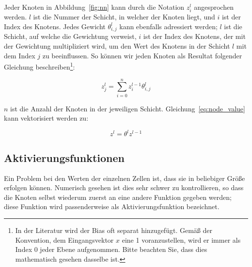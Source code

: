 Jeder Knoten in Abbildung~\ref{fig:nn} kann durch die Notation $z^l_i$ angesprochen werden.
$l$ ist die Nummer der Schicht, in welcher der Knoten liegt, und $i$ ist der Index des Knotens.
Jedes Gewicht $\theta^l_{i, j}$ kann ebenfalls adressiert werden; $l$ ist die Schicht, auf welche die Gewichtung verweist, $i$ ist der Index des Knotens, der mit der Gewichtung multipliziert wird, um den Wert des Knotens in der Schicht $l$ mit dem Index $j$ zu beeinflussen.
So können wir jeden Knoten als Resultat folgender Gleichung beschreiben\footnote{In der Literatur wird der Bias oft separat hinzugefügt.
Gemäß der Konvention, dem Eingangsvektor $x$ eine 1 voranzustellen, wird er immer als Index 0 jeder Ebene aufgenommen.
Bitte beachten Sie, dass dies mathematisch gesehen dasselbe ist.}:

\begin{equation}
    z^l_j = \sum^n_{i=0}z^{l-1}_i\theta^l_{i, j}
    \label{eq:node_value}
\end{equation}

$n$ ist die Anzahl der Knoten in der jeweiligen Schicht. Gleichung~\eqref{eq:node_value} kann vektorisiert werden zu:

\begin{equation}
    z^l = \theta^l z^{l-1}
    \label{eq:node_value_vectorized}
\end{equation}

\subsection{Aktivierungsfunktionen}

Ein Problem bei den Werten der einzelnen Zellen ist, dass sie in beliebiger Größe erfolgen können. Numerisch gesehen ist dies sehr schwer zu kontrollieren, so dass die Knoten selbst wiederum zuerst an eine andere Funktion gegeben werden; diese Funktion wird passenderweise als Aktivierungsfunktion bezeichnet.


